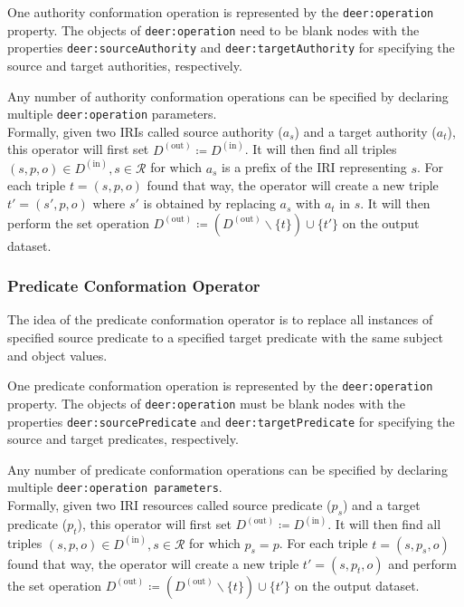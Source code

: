One authority conformation operation is represented by the \texttt{deer:operation} property. The objects of \texttt{deer:operation} need to be blank nodes with the properties \texttt{deer:sourceAuthority} and \texttt{deer:targetAuthority} for specifying the source and target authorities, respectively.

Any number of authority conformation operations can be specified by declaring multiple \texttt{deer:operation} parameters. \\

Formally, given two \acp{IRI} called source authority ($a_s$) and a target authority ($a_t$), this operator will first set $D^{(\text{out})}\coloneq D^{(\text{in})}$.
It will then find all triples $(s,p,o)\in D^{(\text{in})}, s\in \mathcal{R}$ for which $a_s$ is a prefix of the \ac{IRI} representing $s$.
For each triple $t=(s,p,o)$ found that way, the operator will create a new triple $t'=(s',p,o)$ where $s'$ is obtained by replacing $a_s$ with $a_t$ in $s$.
It will then perform the set operation $D^{(\text{out})}\coloneq (D^{(\text{out})}\backslash\{t\})\cup\{t'\}$ on the output dataset.

\subsubsection*{Predicate Conformation Operator}

The idea of the predicate conformation operator is to replace all instances of specified source predicate to a specified target predicate with the same subject and object values.

One predicate conformation operation is represented by the \texttt{deer:operation} property.
The objects of \texttt{deer:operation} must be blank nodes with the properties \texttt{deer:sourcePredicate} and \texttt{deer:targetPredicate} for specifying the source and target predicates, respectively.

Any number of predicate conformation operations can be specified by declaring multiple \texttt{deer:operation parameters}. \\

Formally, given two \ac{IRI} resources called source predicate ($p_s$) and a target predicate ($p_t$), this operator will first set $D^{(\text{out})}\coloneq D^{(\text{in})}$.
It will then find all triples $(s,p,o)\in D^{(\text{in})}, s\in \mathcal{R}$ for which $p_s=p$.
For each triple $t=(s,p_s,o)$ found that way, the operator will create a new triple $t'=(s,p_t,o)$  and perform the set operation $D^{(\text{out})}\coloneq (D^{(\text{out})}\backslash\{t\})\cup\{t'\}$ on the output dataset.

